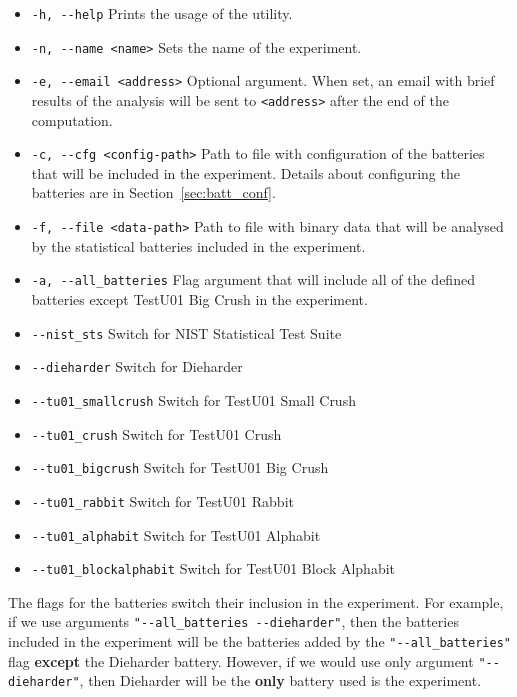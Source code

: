 \documentclass[
	digital,    %
	oneside,    %
	color,
	11pt,
	nocover,
	notable,
	nolof,
	nolot,
]{fithesis3}
\theoremstyle{definition}
\theoremstyle{remark}
\begin{document}
\begin{itemize}
\item \texttt{-h, -{}-help} Prints the usage of the utility.
\item \texttt{-n, -{}-name <name>} Sets the name of the experiment.
\item \texttt{-e, -{}-email <address>} Optional argument. When set, an email with brief results of the analysis will be sent to \texttt{<address>} after the end of the computation.
\item \texttt{-c, -{}-cfg <config-path>} Path to file with configuration of the batteries that will be included in the experiment. Details about configuring the batteries are in Section~\ref{sec:batt_conf}.
\item \texttt{-f, -{}-file <data-path>} Path to file with binary data that will be analysed by the statistical batteries included in the experiment.
\item \texttt{-a, -{}-all\_batteries} Flag argument that will include all of the defined batteries except TestU01 Big Crush in the experiment.
\item \texttt{-{}-nist\_sts} Switch for NIST Statistical Test Suite
\item \texttt{-{}-dieharder} Switch for Dieharder 
\item \texttt{-{}-tu01\_smallcrush} Switch for TestU01 Small Crush
\item \texttt{-{}-tu01\_crush} Switch for TestU01 Crush
\item \texttt{-{}-tu01\_bigcrush} Switch for TestU01 Big Crush
\item \texttt{-{}-tu01\_rabbit} Switch for TestU01 Rabbit
\item \texttt{-{}-tu01\_alphabit} Switch for TestU01 Alphabit
\item \texttt{-{}-tu01\_blockalphabit} Switch for TestU01 Block Alphabit
\end{itemize}

The flags for the batteries switch their inclusion in the experiment. For example, if we use arguments \texttt{"-{}-all\_batteries -{}-dieharder"}, then the batteries included in the experiment will be the batteries added by the \texttt{"-{}-all\_batteries"} flag \textbf{except} the Dieharder battery. However, if we would use only argument \texttt{"-{}-dieharder"}, then Dieharder will be the \textbf{only} battery used is the experiment.
\end{document}
